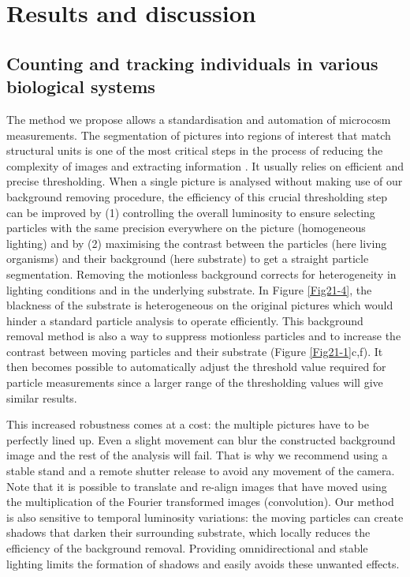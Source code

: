 \section{Results and discussion}

\subsection{Counting and tracking individuals in various biological systems}

The method we propose allows a standardisation and automation of microcosm
measurements. The segmentation of pictures into regions of interest that match
structural units is one of the most critical steps in the process of reducing
the complexity of images and extracting information \autocites{russ2002a}. It
usually relies on efficient and precise thresholding. When a single picture is analysed without
making use of our background removing procedure, the efficiency of this crucial
thresholding step can be improved by (1) controlling the overall luminosity to
ensure selecting particles with the same precision everywhere on the picture
(homogeneous lighting) and by (2) maximising the contrast between the particles
(here living organisms) and their background (here substrate) to get a straight
particle segmentation. Removing the motionless background corrects for
heterogeneity in lighting conditions and in the underlying substrate. In Figure
\ref{Fig21-4}, the blackness of the substrate is heterogeneous on the original
pictures which would hinder a standard particle analysis to operate efficiently. This
background removal method is also a way to suppress motionless particles and to
increase the contrast between moving particles and their substrate (Figure
\ref{Fig21-1}c,f). It then becomes possible to automatically adjust the
threshold value required for particle measurements since a larger range of the thresholding values will give similar results.

This increased robustness comes at a cost: the multiple pictures have to be
perfectly lined up. Even a slight movement can blur the constructed background
image and the rest of the analysis will fail. That is why we recommend using a
stable stand and a remote shutter release to avoid any movement of the camera.
Note that it is possible to translate and re-align images that have moved using
the multiplication of the Fourier transformed images (convolution). Our method
is also sensitive to temporal luminosity variations: the moving particles can
create shadows that darken their surrounding substrate, which locally reduces
the efficiency of the background removal. Providing omnidirectional and stable
lighting limits the formation of shadows and easily avoids these unwanted
effects.

